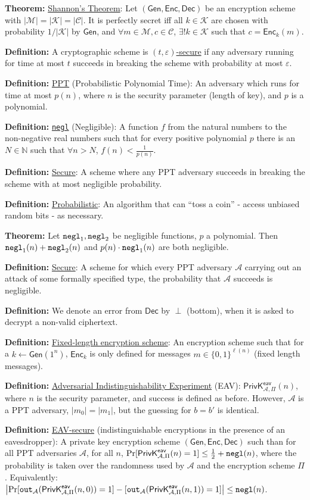 \documentclass[12pt]{article}
\newcommand{\N}{\mathbb{N}}
\newcommand{\AAA}{\mathcal{A}}
\newcommand{\CCC}{\mathcal{C}}
\newcommand{\KKK}{\mathcal{K}}
\newcommand{\MMM}{\mathcal{M}}
\newcommand{\defn}[1]{{\bf Definition:} \underline{#1}}
\newcommand{\thm}[1]{{\bf Theorem:} \underline{#1}}
\newcommand{\Enc}{\mathsf{Enc}}
\newcommand{\Dec}{\mathsf{Dec}}
\newcommand{\Gen}{\mathsf{Gen}}
\newcommand{\GenEncDec}{(\Gen,\Enc,\Dec)}
\newcommand{\ExptEavArgs}[2]{\mathsf{PrivK}^{\mathsf{eav}}_{#1,#2}}
\newcommand{\ExptEav}{\ExptEavArgs{\AAA}{\Pi}}
\newcommand{\negl}{{\tt negl}}
\newcommand{\from}{\leftarrow}
\begin{document}
\begin{multicols}{3}
\thm{Shannon's Theorem}: Let $\GenEncDec$ be an encryption scheme with $|\MMM|=|\KKK|=|\CCC|$. It is perfectly secret iff all $k\in\KKK$ are chosen with probability $1/|\KKK|$ by $\Gen$, and $\forall m\in\MMM, c\in\CCC$, $\exists!k\in\KKK$ such that $c=\Enc_k(m)$.

\defn{}A cryptographic scheme is \underline{$(t,\varepsilon)$-secure} if any adversary running for time at most $t$ succeeds in breaking the scheme with probability at most $\varepsilon$.

\defn{PPT} (Probabilistic Polynomial Time): An adversary which runs for time at most $p(n)$, where $n$ is the security parameter (length of key), and $p$ is a polynomial.

\defn{\negl} (Negligible): A function $f$ from the natural numbers to the non-negative real numbers such that for every positive polynomial $p$ there is an $N\in\N$ such that $\forall n>N$, $f(n)<\frac{1}{p(n)}$.

\defn{Secure}: A scheme where any PPT adversary succeeds in breaking the scheme with at most negligible probability.

\defn{Probabilistic}: An algorithm that can ``toss a coin'' - access unbiased random bits - as necessary.

\thm{}Let $\negl_1,\negl_2$ be negligible functions, $p$ a polynomial. Then $\negl_1(n)+\negl_2(n)$ and $p(n)\cdot\negl_1(n)$ are both negligible.

\defn{Secure}: A scheme for which every PPT adversary $\AAA$ carrying out an attack of some formally specified type, the probability that $\AAA$ succeeds is negligible.

\defn{}We denote an error from $\Dec$ by $\perp$ (bottom), when it is asked to decrypt a non-valid ciphertext.

\defn{Fixed-length encryption scheme}: An encryption scheme such that for a $k\from\Gen(1^n)$, $\Enc_k$ is only defined for messages $m\in\{0,1\}^{\ell(n)}$ (fixed length messages).

\defn{Adversarial Indistinguishability Experiment} (EAV): $\ExptEav(n)$, where $n$ is the security parameter, and success is defined as before. However, $\AAA$ is a PPT adversary, $|m_0|=|m_1|$, but the guessing for $b=b'$ is identical.

\defn{EAV-secure} (indistinguishable encryptions in the presence of an eavesdropper): A private key encryption scheme $\GenEncDec$ such than for all PPT adversaries $\AAA$, for all $n$, $\Pr[\ExptEav(n)=1]\leq\frac{1}{2}+\negl(n)$, where the probability is taken over the randomness used by $\AAA$ and the encryption scheme $\Pi$. Equivalently: $\left|\Pr[{\tt out}_{\AAA}(\ExptEav(n,0))=1]-[{\tt out}_{\AAA}(\ExptEav(n,1))=1]\right|\leq\negl(n)$.


\end{multicols}
\end{document}
